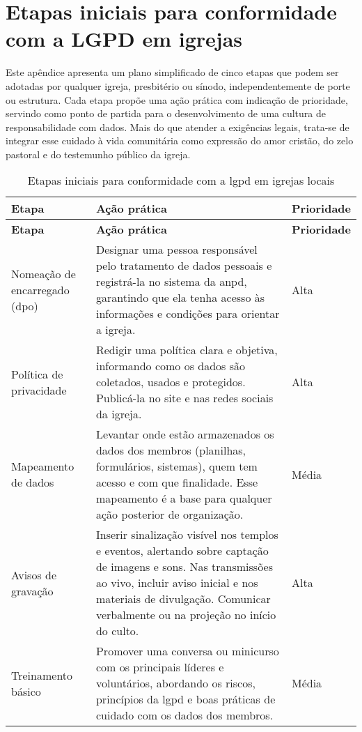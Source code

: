 \chapter{Etapas iniciais para conformidade com a LGPD em igrejas} \label{apendice:etapas-lgpd-igrejas}

Este apêndice apresenta um plano simplificado de cinco etapas que podem ser adotadas por qualquer igreja, presbitério ou sínodo, independentemente de porte ou estrutura. Cada etapa propõe uma ação prática com indicação de prioridade, servindo como ponto de partida para o desenvolvimento de uma cultura de responsabilidade com dados. Mais do que atender a exigências legais, trata-se de integrar esse cuidado à vida comunitária como expressão do amor cristão, do zelo pastoral e do testemunho público da igreja.

\begin{longtable}{>{\raggedright\arraybackslash}p{4cm} >{\raggedright\arraybackslash}p{10cm} p{2cm}}
\caption{Etapas iniciais para conformidade com a \gls{lgpd} em igrejas locais}
\label{tab:etapas-lgpd-igreja} \\
\toprule
\textbf{Etapa} & \textbf{Ação prática} & \textbf{Prioridade} \\
\midrule
\endfirsthead

\toprule
\textbf{Etapa} & \textbf{Ação prática} & \textbf{Prioridade} \\
\midrule
\endhead

\bottomrule
\endfoot

Nomeação de encarregado (\gls{dpo})\tnote{a} & Designar uma pessoa responsável pelo tratamento de dados pessoais e registrá-la no sistema da \gls{anpd}, garantindo que ela tenha acesso às informações e condições para orientar a igreja. & Alta \\
Política de privacidade & Redigir uma política clara e objetiva, informando como os dados são coletados, usados e protegidos. Publicá-la no site e nas redes sociais da igreja. & Alta \\
Mapeamento de dados & Levantar onde estão armazenados os dados dos membros (planilhas, formulários, sistemas), quem tem acesso e com que finalidade. Esse mapeamento é a base para qualquer ação posterior de organização. & Média \\
Avisos de gravação & Inserir sinalização visível nos templos e eventos, alertando sobre captação de imagens e sons. Nas transmissões ao vivo, incluir aviso inicial e nos materiais de divulgação. Comunicar verbalmente ou na projeção no início do culto. & Alta \\
Treinamento básico & Promover uma conversa ou minicurso com os principais líderes e voluntários, abordando os riscos, princípios da \gls{lgpd} e boas práticas de cuidado com os dados dos membros. & Média \\
\end{longtable}
